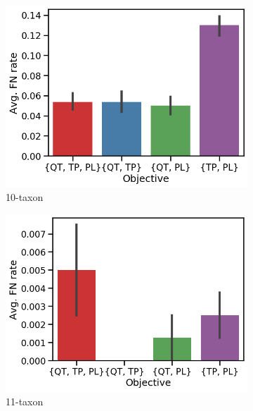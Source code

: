 \begin{figure}[!htbp]
	\centering
\begin{subfigure}[b]{0.33\textwidth}
		\includegraphics[width=\textwidth]{Figure/10-taxon_obj_wise_perf}
		\caption{10-taxon}
\end{subfigure}\begin{subfigure}[b]{0.33\textwidth}
		\includegraphics[width=\textwidth]{Figure/11-taxon_obj_wise_perf}
		\caption{11-taxon}
\end{subfigure}\begin{subfigure}[b]{0.33\textwidth}

\end{subfigure}
\end{figure}
